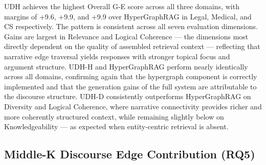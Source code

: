 \documentclass[runningheads]{llncs}
\begin{document}
\begin{table}[h]
\centering
\caption{UltraDomain Computer Science --- Generation Evaluation (G-E, 0--100). Bold indicates best.}
\label{tab:ultra_cs}
\end{table}

UDH achieves the highest Overall G-E score across all three domains, with margins of +9.6, +9.9, and +9.9 over HyperGraphRAG in Legal, Medical, and CS respectively. The pattern is consistent across all seven evaluation dimensions. Gains are largest in Relevance and Logical Coherence --- the dimensions most directly dependent on the quality of assembled retrieval context --- reflecting that narrative edge traversal yields responses with stronger topical focus and argument structure. UDH-H and HyperGraphRAG perform nearly identically across all domains, confirming again that the hypergraph component is correctly implemented and that the generation gains of the full system are attributable to the discourse structure. UDH-D consistently outperforms HyperGraphRAG on Diversity and Logical Coherence, where narrative connectivity provides richer and more coherently structured context, while remaining slightly below on Knowledgeability --- as expected when entity-centric retrieval is absent.

\subsection{Middle-K Discourse Edge Contribution (RQ5)}
\end{document}
